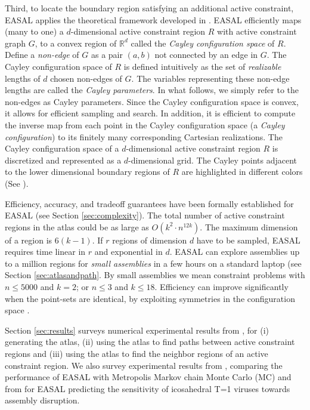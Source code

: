  
Third, to locate the boundary region satisfying an additional active
constraint, EASAL applies the theoretical framework developed in
\cite{SiGa:2010}. EASAL efficiently maps (many to one) a $d$-dimensional active
constraint region $R$ with active constraint graph $G$, to a convex region of
$\mathbb{R}^d$ called the \emph{Cayley configuration space} of $R$. Define 
a \emph{non-edge} of $G$ as a pair $(a,b)$ not connected by an edge in $G$.
The Cayley configuration space of $R$ is defined intuitively as the set of
\emph{realizable} lengths of $d$ chosen non-edges of $G$. The variables representing these 
non-edge lengths are called the \emph{Cayley parameters}. In what follows, we simply refer to the
non-edges as Cayley parameters.  Since the Cayley
configuration space is convex, it allows for efficient sampling and search. In
addition, it is efficient to compute the inverse map from each point in the
Cayley configuration space (a \emph{Cayley configuration}) to its finitely many
corresponding Cartesian realizations.  The Cayley configuration space of a
$d$-dimensional active constraint region $R$ is discretized and represented as a
$d$-dimensional grid.  The Cayley points adjacent to the lower dimensional boundary regions of $R$ are
highlighted in different colors (See ).



Efficiency, accuracy, and tradeoff guarantees have been formally established for
EASAL (see Section \ref{sec:complexity}). The total number of active constraint
regions in the atlas could be as large as $O(k^2 \cdot n^{12k})$.  The maximum
dimension of a region is $6(k-1)$. If $r$ regions of dimension $d$ have to be
sampled, EASAL requires time linear in $r$ and exponential in $d$.  EASAL can
explore assemblies up to a million regions for \emph{small assemblies} in a few
hours on a standard laptop (see Section \ref{sec:atlasandpath}. By small
assemblies we mean constraint problems with $n \le 5000$ and $k=2$; or $n\le 3$
and $k\le 18$.  Efficiency can improve significantly when the point-sets are
identical, by exploiting symmetries in the configuration space
\cite{sym8010005}. 



Section \ref{sec:results} surveys numerical experimental results from
\cite{Ozkan2014MainEasal}, for (i) generating the atlas, (ii) using the atlas
to find paths between active constraint regions and (iii) using the atlas to
find the neighbor regions of an active constraint region. We also survey
experimental results from \cite{Ozkan2014MC}, comparing the performance of
EASAL with Metropolis Markov chain Monte Carlo (MC) and from \cite{Wu2014Virus}
for EASAL predicting the sensitivity of icosahedral T=1 viruses towards
assembly disruption.\\


